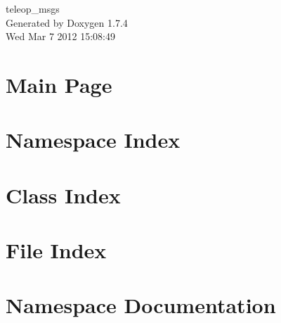 \documentclass[a4paper]{book}
\begin{document}
\begin{titlepage}
\vspace*{7cm}
\begin{center}
{\Large teleop\_\-msgs }\\
\vspace*{1cm}
{\large Generated by Doxygen 1.7.4}\\
\vspace*{0.5cm}
{\small Wed Mar 7 2012 15:08:49}\\
\end{center}
\end{titlepage}
\clearemptydoublepage
{}
\tableofcontents
\clearemptydoublepage
{}
\chapter{Main Page}
\label{index}
\chapter{Namespace Index}

\chapter{Class Index}

\chapter{File Index}

\chapter{Namespace Documentation}









\end{document}
